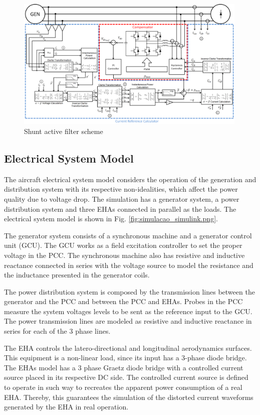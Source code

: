 \begin{figure}[!tb] %
	\centering
	\includegraphics[width=0.99\textwidth]{Figures/filtro_blocos.png}
	\caption{Shunt active filter scheme}
	\label{fig:filtro_blocos.png}
\end{figure}

\subsection{Electrical System Model}

The aircraft electrical system model considers the operation of the generation and distribution system with its respective non-idealities, which affect the power quality due to voltage drop. The simulation has a generator system, a power distribution system and three EHAs connected in parallel as the loads. The electrical system model is shown in Fig. \ref{fig:simulacao_simulink.png}.

The generator system consists of a synchronous machine and a generator control unit (GCU). The GCU works as a field excitation controller to set the proper voltage in the PCC. The synchronous machine also has resistive and inductive reactance connected in series with the voltage source to model the resistance and the inductance presented in the generator coils.

The power distribution system is composed by the transmission lines between the generator and the PCC and between the PCC and EHAs. Probes in the PCC measure the system voltages levels to be sent as the reference input to the GCU. The power transmission lines are modeled as resistive and inductive reactance in series for each of the 3 phase lines.

The EHA controls the latero-directional and longitudinal aerodynamics surfaces. This equipment is a non-linear load, since its input has a 3-phase diode bridge. The EHAs model has a 3 phase Graetz diode bridge with a controlled current source placed in its respective DC side. The controlled current source is defined to operate in such way to recreates the apparent power consumption of a real EHA. Thereby, this guarantees the simulation of the distorted current waveforms generated by the EHA in real operation.

